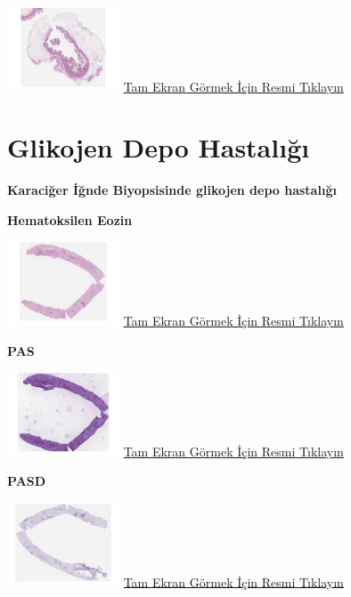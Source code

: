 \documentclass[
  letterpaper,
  DIV=11,
  numbers=noendperiod]{scrreprt}
\begin{document}
\href{https://images.patolojiatlasi.com/cholesterolpolyp/HE.html}{\includegraphics[width=0.25\textwidth,height=\textheight]{./screenshots/cholesterolpolyp_screenshot.png}}
\href{https://images.patolojiatlasi.com/cholesterolpolyp/HE.html}{Tam
Ekran Görmek İçin Resmi Tıklayın}

\hypertarget{sec-glikojen-depo-hastaligi}{%
\section{Glikojen Depo Hastalığı}\label{sec-glikojen-depo-hastaligi}}

\textbf{Karaciğer İğnde Biyopsisinde glikojen depo hastalığı}

\textbf{Hematoksilen Eozin}

\href{https://images.patolojiatlasi.com/glycogenstorage/HE.html}{\includegraphics[width=0.25\textwidth,height=\textheight]{./screenshots/glycogenstorage-HE_screenshot.png}}
\href{https://images.patolojiatlasi.com/glycogenstorage/HE.html}{Tam
Ekran Görmek İçin Resmi Tıklayın}

\textbf{PAS}

\href{https://images.patolojiatlasi.com/glycogenstorage/PAS.html}{\includegraphics[width=0.25\textwidth,height=\textheight]{./screenshots/glycogenstorage-PAS_screenshot.png}}
\href{https://images.patolojiatlasi.com/glycogenstorage/PAS.html}{Tam
Ekran Görmek İçin Resmi Tıklayın}

\textbf{PASD}

\href{https://images.patolojiatlasi.com/glycogenstorage/PASD.html}{\includegraphics[width=0.25\textwidth,height=\textheight]{./screenshots/glycogenstorage-PASD_screenshot.png}}
\href{https://images.patolojiatlasi.com/glycogenstorage/PASD.html}{Tam
Ekran Görmek İçin Resmi Tıklayın}
\end{document}
